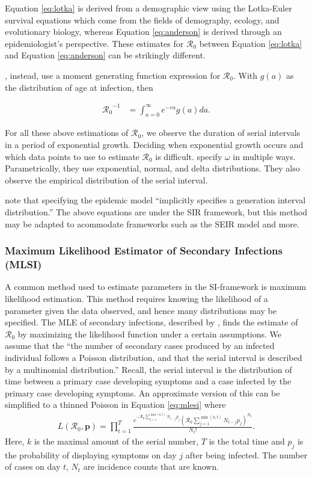 \documentclass[12pt]{article}
\newcommand{\rr}{\ensuremath{\mathcal{R}_0}}
\begin{document}
Equation \eqref{eq:lotka} is derived from a demographic view using the Lotka-Euler survival equations which come from the fields of demography, ecology, and evolutionary biology, whereas Equation \eqref{eq:anderson} is derived through an epidemiologist's perspective.  These estimates for $\rr$ between Equation \eqref{eq:lotka} and Equation \eqref{eq:anderson} can be strikingly different.

\cite{wallinga2007generation}, instead, use a moment generating function expression for $\rr$.  With $g(a)$ as the distribution of age at infection, then

\begin{align*}
\rr^{-1} &= \int_{a=0}^\infty e^{-ra}g(a)da.
\end{align*}

For all these above estimations of $\rr$, we observe the duration of serial intervals in a period of exponential growth.  Deciding when exponential growth occurs and which data points to use to estimate $\rr$ is difficult.  \citeauthor{wallinga2007generation} specify $\omega$ in multiple ways.  Parametrically, they use exponential, normal, and delta distributions.  They also observe the empirical distribution of the serial interval.

\citeauthor{wallinga2007generation} note that specifying the epidemic model ``implicitly specifies a generation interval distribution.''  The above equations are under the SIR framework, but this method may be adapted to acommodate frameworks such as the SEIR model and more.

\subsubsection{Maximum Likelihood Estimator of Secondary Infections (MLSI)}\label{sec:mle-si}
A common method used to estimate parameters in the SI-framework is maximum likelihood estimation.  This method requires knowing the likelihood of a parameter given the data observed, and hence many distributions may be specified.  The MLE of secondary infections, described by \cite{forsberg2008}, finds the estimate of $\rr$ by maximizing the likelihood function under a certain assumptions.  We assume that the ``the number of secondary cases produced by an infected individual follows a Poisson distribution, and that the serial interval is described by a multinomial distribution.''  Recall, the serial interval is the distribution of time between a primary case developing symptoms and a case infected by the primary case developing symptoms.  An approximate version of this can be simplified to a thinned Poisson in Equation \ref{eq:mlesi} where
\begin{align}\label{eq:mlesi}
  L(\rr, \mathbf{p}) = \prod_{t=1}^T \frac{e^{- \rr \sum_{j=1}^{\min(k,t)}N_{t-j}p_j}\left (\rr \sum_{j=1}^{\min(k,t)}N_{t-j}p_j \right )^{N_t}}{N_t!}.
\end{align}
Here, $k$ is the maximal amount of the serial number, $T$ is the total time and $p_j$ is the probability of displaying symptoms on day $j$ after being infected.  The number of cases on day $t$, $N_t$ are incidence counts that are known. 
\end{document}
